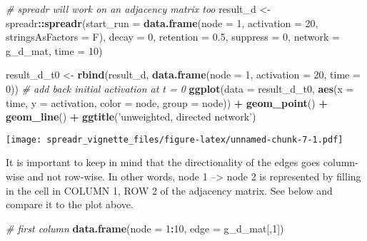 \documentclass[]{article}
\newenvironment{Shaded}{\begin{snugshade}}{\end{snugshade}}
\newcommand{\KeywordTok}[1]{\textcolor[rgb]{0.13,0.29,0.53}{\textbf{#1}}}
\newcommand{\DataTypeTok}[1]{\textcolor[rgb]{0.13,0.29,0.53}{#1}}
\newcommand{\DecValTok}[1]{\textcolor[rgb]{0.00,0.00,0.81}{#1}}
\newcommand{\FloatTok}[1]{\textcolor[rgb]{0.00,0.00,0.81}{#1}}
\newcommand{\StringTok}[1]{\textcolor[rgb]{0.31,0.60,0.02}{#1}}
\newcommand{\CommentTok}[1]{\textcolor[rgb]{0.56,0.35,0.01}{\textit{#1}}}
\newcommand{\OperatorTok}[1]{\textcolor[rgb]{0.81,0.36,0.00}{\textbf{#1}}}
\newcommand{\NormalTok}[1]{#1}
\begin{document}
\begin{Shaded}
\begin{Highlighting}[]
\CommentTok{# spreadr will work on an adjacency matrix too }
\NormalTok{result_d <-}\StringTok{ }\NormalTok{spreadr}\OperatorTok{::}\KeywordTok{spreadr}\NormalTok{(}\DataTypeTok{start_run =} \KeywordTok{data.frame}\NormalTok{(}\DataTypeTok{node =} \DecValTok{1}\NormalTok{, }\DataTypeTok{activation =} \DecValTok{20}\NormalTok{, }\DataTypeTok{stringsAsFactors =}\NormalTok{ F), }
                             \DataTypeTok{decay =} \DecValTok{0}\NormalTok{,}
                              \DataTypeTok{retention =} \FloatTok{0.5}\NormalTok{, }\DataTypeTok{suppress =} \DecValTok{0}\NormalTok{,}
                              \DataTypeTok{network =}\NormalTok{ g_d_mat, }\DataTypeTok{time =} \DecValTok{10}\NormalTok{) }

\NormalTok{result_d_t0 <-}\StringTok{ }\KeywordTok{rbind}\NormalTok{(result_d, }\KeywordTok{data.frame}\NormalTok{(}\DataTypeTok{node =} \DecValTok{1}\NormalTok{, }\DataTypeTok{activation =} \DecValTok{20}\NormalTok{, }\DataTypeTok{time =} \DecValTok{0}\NormalTok{)) }\CommentTok{# add back initial activation at t = 0}
\KeywordTok{ggplot}\NormalTok{(}\DataTypeTok{data =}\NormalTok{ result_d_t0, }\KeywordTok{aes}\NormalTok{(}\DataTypeTok{x =}\NormalTok{ time, }\DataTypeTok{y =}\NormalTok{ activation, }\DataTypeTok{color =}\NormalTok{ node, }\DataTypeTok{group =}\NormalTok{ node)) }\OperatorTok{+}
\StringTok{  }\KeywordTok{geom_point}\NormalTok{() }\OperatorTok{+}\StringTok{ }\KeywordTok{geom_line}\NormalTok{() }\OperatorTok{+}\StringTok{ }\KeywordTok{ggtitle}\NormalTok{(}\StringTok{'unweighted, directed network'}\NormalTok{) }
\end{Highlighting}
\end{Shaded}

\texttt{[image: spreadr\_vignette\_files/figure-latex/unnamed-chunk-7-1.pdf]}

It is important to keep in mind that the directionality of the edges
goes column-wise and not row-wise. In other words, node 1
--\textgreater{} node 2 is represented by filling in the cell in COLUMN
1, ROW 2 of the adjacency matrix. See below and compare it to the plot
above.

\begin{Shaded}
\begin{Highlighting}[]
\CommentTok{# first column }
\KeywordTok{data.frame}\NormalTok{(}\DataTypeTok{node =} \DecValTok{1}\OperatorTok{:}\DecValTok{10}\NormalTok{, }\DataTypeTok{edge =}\NormalTok{ g_d_mat[,}\DecValTok{1}\NormalTok{])}
\end{Highlighting}
\end{Shaded}
\end{document}
